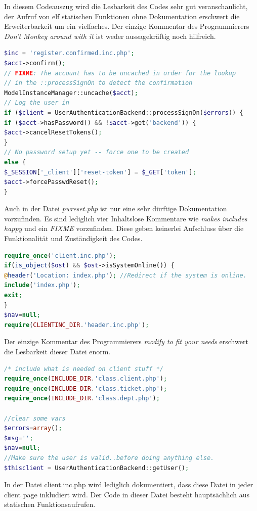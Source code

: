 In diesem Codeauszug wird die Lesbarkeit des Codes sehr gut veranschaulicht, der Aufruf von elf statischen Funktionen ohne Dokumentation erschwert die Erweiterbarkeit um ein vielfaches. Der einzige Kommentar des Programmierers \textit{Don't Monkey around with it} ist weder aussagekräftig noch hilfreich.
\newpage
\begin{lstlisting}[language=PHP, caption=pwreset.php, firstnumber=51]
$inc = 'register.confirmed.inc.php';
$acct->confirm();
// FIXME: The account has to be uncached in order for the lookup
// in the ::processSignOn to detect the confirmation
ModelInstanceManager::uncache($acct);
// Log the user in
if ($client = UserAuthenticationBackend::processSignOn($errors)) {
if ($acct->hasPassword() && !$acct->get('backend')) {
$acct->cancelResetTokens();
}
// No password setup yet -- force one to be created
else {
$_SESSION['_client']['reset-token'] = $_GET['token'];
$acct->forcePasswdReset();
}
\end{lstlisting}
Auch in der Datei \textit{pwreset.php} ist nur eine sehr dürftige Dokumentation vorzufinden. Es sind lediglich vier Inhaltslose Kommentare wie \textit{makes includes happy} und ein \textit{FIXME} vorzufinden. Diese geben keinerlei Aufschluss über die Funktionalität und Zuständigkeit des Codes.
\newpage
\begin{lstlisting}[language=PHP, caption=offline.php, firstnumber=16]
require_once('client.inc.php');
if(is_object($ost) && $ost->isSystemOnline()) {
@header('Location: index.php'); //Redirect if the system is online.
include('index.php');
exit;
}
$nav=null;
require(CLIENTINC_DIR.'header.inc.php');
\end{lstlisting}
Der einzige Kommentar des Programmierers \textit{modify to fit your needs} erschwert die Lesbarkeit dieser Datei enorm.


\begin{lstlisting}[language=PHP, caption=client.inc.php, firstnumber=38]
/* include what is needed on client stuff */
require_once(INCLUDE_DIR.'class.client.php');
require_once(INCLUDE_DIR.'class.ticket.php');
require_once(INCLUDE_DIR.'class.dept.php');

//clear some vars
$errors=array();
$msg='';
$nav=null;
//Make sure the user is valid..before doing anything else.
$thisclient = UserAuthenticationBackend::getUser();
\end{lstlisting}
In der Datei client.inc.php wird lediglich dokumentiert, dass diese Datei in jeder client page inkludiert wird. Der Code in dieser Datei besteht hauptsächlich aus statischen Funktionsaufrufen.

